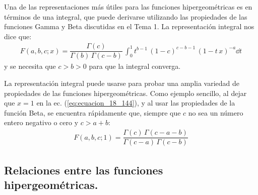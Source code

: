 Una de las representaciones más útiles para las funciones hipergeométricas es en términos de una integral, que puede derivarse utilizando las propiedades de las funciones Gamma y Beta discutidas en el Tema 1. La representación integral nos dice que:
\begin{align}
F(a, b, c; x) = \dfrac{\Gamma (c)}{\Gamma (b) \, \Gamma (c -b)} \, \int_{0}^{1} t^{b-1} \, (1 - c)^{c-b-1} \, (1 - t \, x)^{-a} \dd{t}
\label{eq:ecuacion_18_144}
\end{align}
y se necesita que $c > b > 0$ para que la integral converga.
\par
La representación integral puede usarse para probar una amplia variedad de propiedades de las funciones hipergeométricas. Como ejemplo sencillo, al dejar que $x = 1$ en la ec. (\ref{eq:ecuacion_18_144}), y al usar las propiedades de la función Beta, se encuentra rápidamente que, siempre que $c$ no sea un número entero negativo o cero y $c > a + b$:
\begin{align*}
F(a, b, c; 1) = \dfrac{\Gamma (c) \, \Gamma (c - a - b)}{\Gamma (c - a) \, \Gamma(c - b)}
\end{align*}

\subsection{Relaciones entre las funciones hipergeométricas.}

